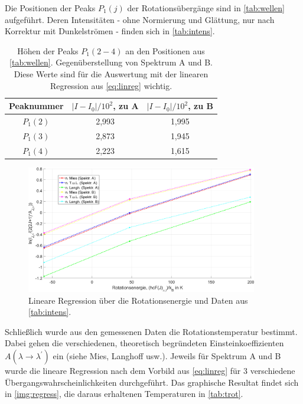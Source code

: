 \documentclass[numbers=noenddot,a4paper,notitlepage,twoside,BCOR15mm]{scrartcl}
\newcommand{\tenpo}[1]{ 10^{#1}}
\newcommand{\ix}[1]{_\text{#1}}
\begin{document}
			Die Positionen der Peaks $P\ix{1}(j)$ der Rotationsübergänge sind in \autoref{tab:wellen} aufgeführt. Deren Intensitäten - ohne Normierung und Glättung, nur nach Korrektur mit Dunkelströmen - finden sich in \autoref{tab:intens}.

				\begin{table}[h]
					\centering
					\begin{tabular}{c|c|c}
						Peaknummer & $|I-I\ix{0}|/\tenpo{2}$, zu A & $|I-I\ix{0}|/\tenpo{2}$, zu B\\
						\hline $P\ix{1}(2)$ & 2,993 & 1,995 \\
						\hline $P\ix{1}(3)$ & 2,873 & 1,945 \\
						\hline $P\ix{1}(4)$ & 2,223 & 1,615
					\end{tabular}
					\caption{Höhen der Peaks $P\ix{1}(2-4)$ an den Positionen aus \autoref{tab:wellen}. Gegenüberstellung von Spektrum A und B. Diese Werte sind für die Auswertung mit der linearen Regression aus \autoref{eq:linreg} wichtig.}
					\label{tab:intens}
				\end{table}

				\begin{figure}[h]
					\centering
					\includegraphics[width=0.9\textwidth]{linear_reg.png}
					\caption{Lineare Regression über die Rotationsenergie und Daten aus \autoref{tab:intens}.}
					\label{img:regress}
				\end{figure}

			Schließlich wurde aus den gemessenen Daten die Rotationstemperatur bestimmt. Dabei gehen die verschiedenen, theoretisch begründeten Einsteinkoeffizienten $A(\lambda\rightarrow\lambda^\prime)$ ein (siehe Mies, Langhoff usw.). Jeweils für Spektrum A und B wurde die lineare Regression nach dem Vorbild aus \autoref{eq:linreg} für 3 verschiedene Übergangswahrscheinlichkeiten durchgeführt. Das graphische Resultat findet sich in \autoref{img:regress}, die daraus erhaltenen Temperaturen in \autoref{tab:trot}.
\end{document}
